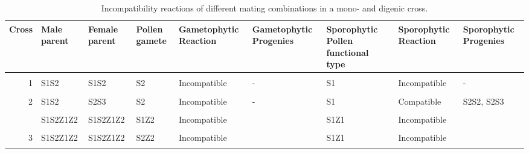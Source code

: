 \documentclass[11pt,ignorenonframetext,aspectratio=169]{beamer}
\begin{document}
\begin{frame}{}
\protect\hypertarget{section-6}{}
\begin{table}

\caption{\label{tab:si-comparison-reaction1}Incompatibility reactions of different mating combinations in a mono- and digenic cross.}
\centering
\fontsize{6}{8}\selectfont
\begin{tabular}[t]{r>{\raggedright\arraybackslash}p{4em}>{\raggedright\arraybackslash}p{4em}>{\raggedright\arraybackslash}p{4em}>{\raggedright\arraybackslash}p{6em}>{\raggedright\arraybackslash}p{8em}>{\raggedright\arraybackslash}p{8em}>{\raggedright\arraybackslash}p{6em}>{\raggedright\arraybackslash}p{8em}}
\toprule
Cross & Male parent & Female parent & Pollen gamete & Gametophytic Reaction & Gametophytic Progenies & Sporophytic Pollen functional type & Sporophytic Reaction & Sporophytic Progenies\\
\midrule
\cellcolor{gray!6}{1} & \cellcolor{gray!6}{S1S2} & \cellcolor{gray!6}{S1S2} & \cellcolor{gray!6}{S1} & \cellcolor{gray!6}{Incompatible} & \cellcolor{gray!6}{-} & \cellcolor{gray!6}{S1} & \cellcolor{gray!6}{Incompatible} & \cellcolor{gray!6}{-}\\
1 & S1S2 & S1S2 & S2 & Incompatible & - & S1 & Incompatible & -\\
\cellcolor{gray!6}{2} & \cellcolor{gray!6}{S1S2} & \cellcolor{gray!6}{S2S3} & \cellcolor{gray!6}{S1} & \cellcolor{gray!6}{Compatible} & \cellcolor{gray!6}{S1S2, S1S3} & \cellcolor{gray!6}{S1} & \cellcolor{gray!6}{Compatible} & \cellcolor{gray!6}{S1S2, S1S3}\\
2 & S1S2 & S2S3 & S2 & Incompatible & - & S1 & Compatible & S2S2, S2S3\\
\cellcolor{gray!6}{3} & \cellcolor{gray!6}{S1S2Z1Z2} & \cellcolor{gray!6}{S1S2Z1Z2} & \cellcolor{gray!6}{S1Z1} & \cellcolor{gray!6}{Incompatible} & \cellcolor{gray!6}{} & \cellcolor{gray!6}{S1Z1} & \cellcolor{gray!6}{Incompatible} & \cellcolor{gray!6}{}\\
\addlinespace
3 & S1S2Z1Z2 & S1S2Z1Z2 & S1Z2 & Incompatible &  & S1Z1 & Incompatible & \\
\cellcolor{gray!6}{3} & \cellcolor{gray!6}{S1S2Z1Z2} & \cellcolor{gray!6}{S1S2Z1Z2} & \cellcolor{gray!6}{S2Z1} & \cellcolor{gray!6}{Incompatible} & \cellcolor{gray!6}{} & \cellcolor{gray!6}{S1Z1} & \cellcolor{gray!6}{Incompatible} & \cellcolor{gray!6}{}\\
3 & S1S2Z1Z2 & S1S2Z1Z2 & S2Z2 & Incompatible &  & S1Z1 & Incompatible & \\
\cellcolor{gray!6}{4} & \cellcolor{gray!6}{S1S2Z1Z3} & \cellcolor{gray!6}{S1S2Z1Z2} & \cellcolor{gray!6}{S1Z1} & \cellcolor{gray!6}{Incompatible} & \cellcolor{gray!6}{} & \cellcolor{gray!6}{S1Z1} & \cellcolor{gray!6}{Incompatible} & \cellcolor{gray!6}{}\\

\end{tabular}
\end{table}
\end{frame}
\end{document}
